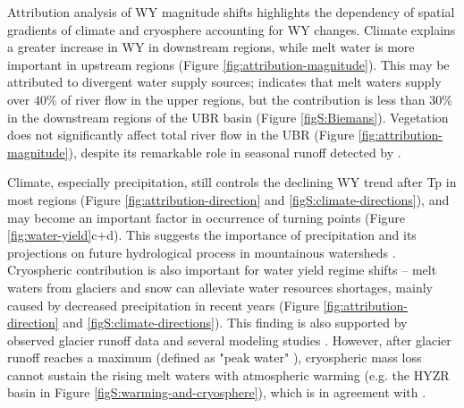 \documentclass[hess, manuscript]{copernicus}
\begin{document}
Attribution analysis of WY magnitude shifts highlights the dependency of spatial gradients of climate and cryosphere accounting for WY changes. Climate explains a greater increase in WY in downstream regions, while melt water is more important in upstream regions (Figure \ref{fig:attribution-magnitude}). 
This may be attributed to divergent water supply sources; \citet{biemans2019importance} indicates that melt waters supply over 40\% of river flow in the upper regions, but the contribution is less than 30\% in the downstream regions of the UBR basin (Figure \ref{figS:Biemans}). Vegetation does not significantly affect total river flow in the UBR (Figure \ref{fig:attribution-magnitude}), despite its remarkable role in seasonal runoff detected by \citet{li2021vegetation}. 

Climate, especially precipitation, still controls the declining WY trend after Tp in most regions (Figure \ref{fig:attribution-direction} and \ref{figS:climate-directions}), and may become an important factor in occurrence of turning points (Figure \ref{fig:water-yield}c+d). This suggests the importance of precipitation and its projections on future hydrological process in mountainous watersheds \citep{lutz2014consistent}. Cryospheric contribution is also important for water yield regime shifts -- melt waters from glaciers and snow can alleviate water resources shortages, mainly caused by decreased precipitation in recent years (Figure \ref{fig:attribution-direction} and \ref{figS:climate-directions}). This finding is also supported by observed glacier runoff data \citep{yao2010glacial} and several modeling studies \citep{lutz2014consistent, Zhang2020VariationOM, wang2021tp}. However, after glacier runoff reaches a maximum (defined as "peak water" \citep{gleick2010peak}), cryospheric mass loss cannot sustain the rising melt waters with atmospheric warming (e.g. the HYZR basin in Figure \ref{figS:warming-and-cryosphere}), which is in agreement with \citet{huss2018global}. 
\end{document}
